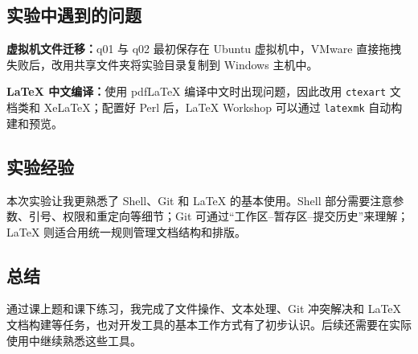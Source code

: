 \documentclass[UTF8,a4paper,11pt]{ctexart}
\begin{document}
\subsection{实验中遇到的问题}

\textbf{虚拟机文件迁移：}q01 与 q02 最初保存在 Ubuntu 虚拟机中，VMware 直接拖拽失败后，改用共享文件夹将实验目录复制到 Windows 主机中。

\textbf{LaTeX 中文编译：}使用 pdfLaTeX 编译中文时出现问题，因此改用 \texttt{ctexart} 文档类和 XeLaTeX；配置好 Perl 后，LaTeX Workshop 可以通过 \texttt{latexmk} 自动构建和预览。

\subsection{实验经验}

本次实验让我更熟悉了 Shell、Git 和 LaTeX 的基本使用。Shell 部分需要注意参数、引号、权限和重定向等细节；Git 可通过“工作区--暂存区--提交历史”来理解；LaTeX 则适合用统一规则管理文档结构和排版。

\subsection{总结}

通过课上题和课下练习，我完成了文件操作、文本处理、Git 冲突解决和 LaTeX 文档构建等任务，也对开发工具的基本工作方式有了初步认识。后续还需要在实际使用中继续熟悉这些工具。
\end{document}
